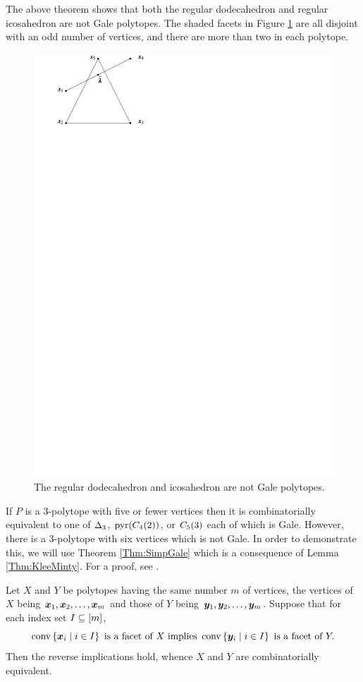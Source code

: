 \begin{Example}
    The above theorem shows that both the regular dodecahedron and regular icosahedron are not Gale polytopes.  The shaded facets in Figure \ref{Fig:RegDodeca} are all disjoint with an odd number of vertices, and there are more than two in each polytope.
    \begin{figure}[ht]
        \centering
            \includegraphics[width=.6\textwidth, page=24]{pictures.pdf}
        \caption{The regular dodecahedron and icosahedron are not Gale polytopes.\label{Fig:RegDodeca}}
    \end{figure}
\end{Example}

If \(P\) is a \(3\)-polytope with five or fewer vertices then it is combinatorially equivalent to one of \(\simp3\), \(\pyr(\cyc24)\), or \(\cyc35\) each of which is Gale.  However, there is a \(3\)-polytope with six vertices which is not Gale.  In order to demonstrate this, we will use Theorem \ref{Thm:SimpGale} which is a consequence of Lemma \ref{Thm:KleeMinty}.  For a proof, see \cite{KleeMinty}.
\begin{Lemma}\label{Thm:KleeMinty}
    Let \(X\) and \(Y\) be polytopes having the same number \(m\) of vertices, the vertices of \(X\) being \(\ve x_1,\ve x_2\dc\ve x_m\) and those of \(Y\) being \(\ve y_1,\ve y_2\dc\ve y_m\).  Suppose that for each index set \(I\sbset\brac m\),
        \[
            \conv\setb{\ve x_i}{i\in I}\text{ is a facet of }X
                \text{ implies }
                    \conv\setb{\ve y_i}{i\in I}\text{ is a facet of }Y.
        \]
    Then the reverse implications hold, whence \(X\) and \(Y\) are combinatorially equivalent.
\end{Lemma}

